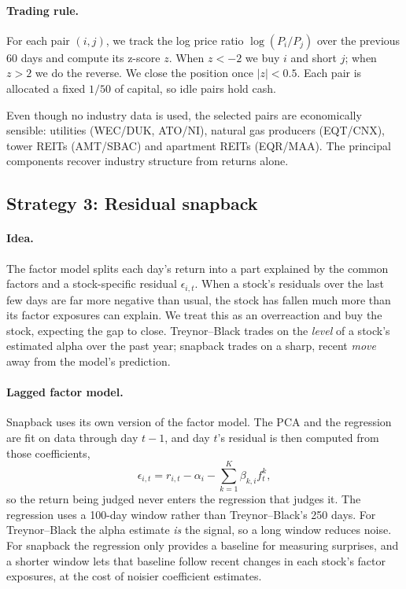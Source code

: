 \documentclass[11pt]{article}
\begin{document}
\paragraph{Trading rule.} For each pair $(i, j)$, we track the log price ratio $\log(P_i / P_j)$ over the previous 60 days and compute its z-score $z$. When $z < -2$ we buy $i$ and short $j$; when $z > 2$ we do the reverse. We close the position once $|z| < 0.5$. Each pair is allocated a fixed $1/50$ of capital, so idle pairs hold cash.

Even though no industry data is used, the selected pairs are economically sensible: utilities (WEC/DUK, ATO/NI), natural gas producers (EQT/CNX), tower REITs (AMT/SBAC) and apartment REITs (EQR/MAA). The principal components recover industry structure from returns alone.

\subsection{Strategy 3: Residual snapback}
\label{sec:snapback}

\paragraph{Idea.} The factor model splits each day's return into a part explained by the common factors and a stock-specific residual $\epsilon_{i,t}$. When a stock's residuals over the last few days are far more negative than usual, the stock has fallen much more than its factor exposures can explain. We treat this as an overreaction and buy the stock, expecting the gap to close. Treynor--Black trades on the \emph{level} of a stock's estimated alpha over the past year; snapback trades on a sharp, recent \emph{move} away from the model's prediction.

\paragraph{Lagged factor model.} Snapback uses its own version of the factor model. The PCA and the regression are fit on data through day $t-1$, and day $t$'s residual is then computed from those coefficients,
\[
    \epsilon_{i,t} = r_{i,t} - \alpha_i - \sum_{k=1}^{K} \beta_{k,i} f^k_t ,
\]
so the return being judged never enters the regression that judges it. The regression uses a 100-day window rather than Treynor--Black's 250 days. For Treynor--Black the alpha estimate \emph{is} the signal, so a long window reduces noise. For snapback the regression only provides a baseline for measuring surprises, and a shorter window lets that baseline follow recent changes in each stock's factor exposures, at the cost of noisier coefficient estimates.
\end{document}
